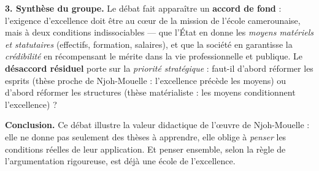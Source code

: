\documentclass[11pt]{article}
\begin{document}
\begin{exoresolu}
\textbf{3. Synthèse du groupe.} Le débat fait apparaître un \textbf{accord de fond} : l'exigence d'excellence doit être au cœur de la mission de l'école camerounaise, mais à deux conditions indissociables — que l'État en donne les \emph{moyens matériels et statutaires} (effectifs, formation, salaires), et que la société en garantisse la \emph{crédibilité} en récompensant le mérite dans la vie professionnelle et publique. Le \textbf{désaccord résiduel} porte sur la \emph{priorité stratégique} : faut-il d'abord réformer les esprits (thèse proche de Njoh-Mouelle : l'excellence précède les moyens) ou d'abord réformer les structures (thèse matérialiste : les moyens conditionnent l'excellence) ?

\textbf{Conclusion.} Ce débat illustre la valeur didactique de l'œuvre de Njoh-Mouelle : elle ne donne pas seulement des thèses à apprendre, elle oblige à \emph{penser} les conditions réelles de leur application. Et penser ensemble, selon la règle de l'argumentation rigoureuse, est déjà une école de l'excellence.
\end{exoresolu}
\end{document}
